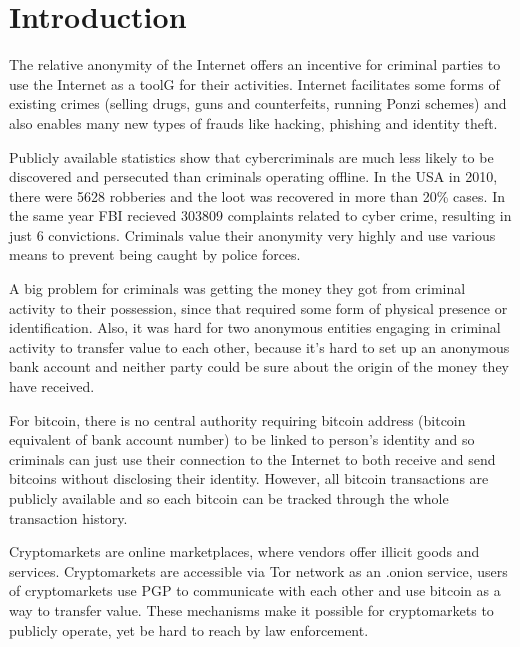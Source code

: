 \documentclass[
  digital, %
  table,   %
  lof,     %
  lot,     %
  oneside
]{fithesis3}
\begin{document}
\chapter{Introduction}

The relative anonymity of the Internet offers an incentive for criminal parties
to use the Internet as a toolG for their activities.
Internet facilitates some forms of existing crimes (selling drugs, guns and
counterfeits, running Ponzi schemes) and also enables many new types of frauds like hacking, phishing and identity theft.

Publicly available statistics show that cybercriminals are much
 less likely to be discovered and persecuted than criminals operating offline.
 In the USA in 2010, there were 5628 robberies and the loot was recovered in more than 20\% cases. \parencite{fbi10} 
 In the same year FBI recieved 303809 complaints related to cyber crime, resulting in just 6 convictions. \parencite{fbcyber} 
Criminals value their anonymity very highly and use various means to prevent being caught by police forces.
\parencite{tzanetakis2016transparency}
\parencite{van2013surfing}
\parencite{aldridge2014not}

A big problem for criminals was getting the money they got from criminal activity to their possession,
since that required some form of physical presence or identification.
Also, it was hard for two anonymous entities engaging in criminal activity to transfer value to each other,
 because it's hard to set up an anonymous bank account and neither party could be sure about the origin of
 the money they have received.

For bitcoin, there is no central authority requiring bitcoin address
(bitcoin equivalent of bank account number) to be linked to person's identity and so 
criminals can just use their connection to the Internet to both receive and send bitcoins without disclosing their identity.
However, all bitcoin transactions are publicly available and so each bitcoin can be tracked through the whole transaction history.

 Cryptomarkets are online marketplaces, where vendors offer illicit goods and services.
 Cryptomarkets are accessible via Tor network as an .onion service, users of
 cryptomarkets use PGP to communicate with each other and use bitcoin as a way to transfer value.
These mechanisms make it possible for cryptomarkets to publicly operate, yet be hard to reach by law enforcement.
\parencite{cox2016staying}
\end{document}

